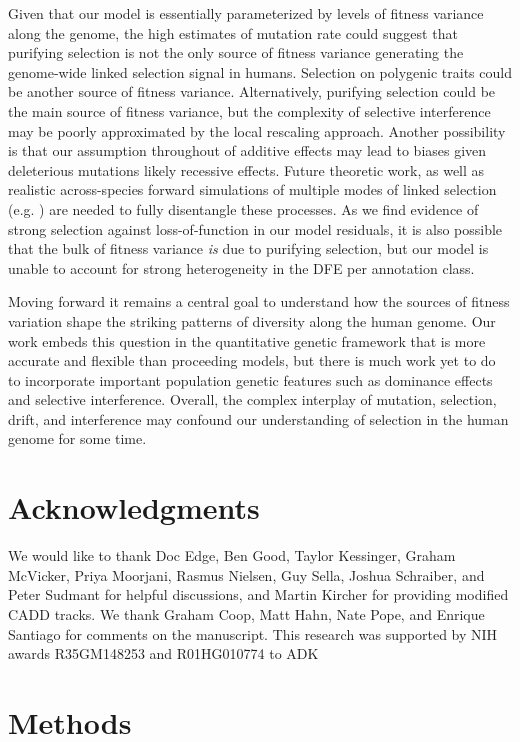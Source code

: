 \documentclass[11pt]{article}
\begin{document}
Given that our model is essentially parameterized by levels of fitness 
variance along the genome, the high estimates of mutation rate could suggest that purifying selection is not the only source of fitness variance generating the genome-wide linked selection signal in humans. 
Selection on polygenic traits could be another source of fitness variance. Alternatively, purifying selection could be the main source of fitness variance, but the complexity of selective interference may be poorly approximated by the local rescaling approach. Another possibility is that our assumption throughout of additive effects may lead to biases given deleterious mutations likely recessive effects. Future theoretic work, as well as realistic across-species forward simulations of multiple modes of linked selection (e.g. \cite{Rodrigues2023-rj}) are needed to fully disentangle these processes. As we find evidence of strong selection against loss-of-function in our model residuals, it is also possible that the bulk of fitness variance \emph{is} due to purifying selection, but our model is unable to account for strong heterogeneity in the DFE per annotation class.

Moving forward it remains a central goal to understand how the sources of fitness variation shape the striking patterns of diversity along the human genome. Our work embeds this question in the quantitative genetic framework that is more accurate and flexible than proceeding models, but there is much work yet to do to incorporate important population genetic features such as dominance effects and selective interference. Overall, the complex interplay of mutation, selection, drift, and interference may confound our understanding of selection in the human genome for some time.

\section*{Acknowledgments}

We would like to thank Doc Edge, Ben Good, Taylor Kessinger, Graham McVicker, Priya Moorjani, Rasmus Nielsen, Guy Sella, Joshua Schraiber, and Peter Sudmant for helpful discussions, and Martin Kircher for providing modified CADD tracks. We thank Graham Coop, Matt Hahn, Nate Pope, and Enrique Santiago for comments on the manuscript.
This research was supported by NIH awards R35GM148253 and R01HG010774 to ADK

\section*{Methods}
\end{document}
